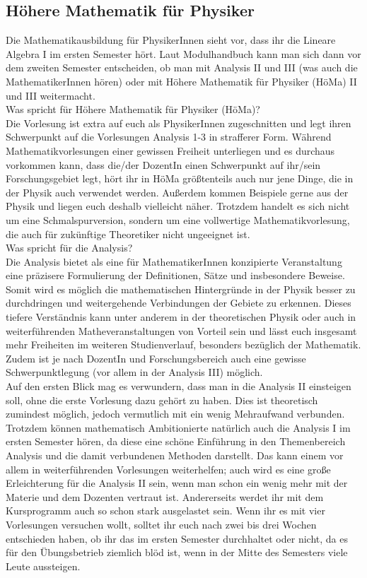 \subsection{Höhere Mathematik für Physiker}
\label{mathephysik}

Die Mathematikausbildung für PhysikerInnen sieht vor, dass ihr die Lineare Algebra I im ersten Semester hört. Laut Modulhandbuch kann man sich dann vor dem zweiten Semester entscheiden, ob man mit Analysis II und III (was auch die MathematikerInnen hören) oder mit Höhere Mathematik für Physiker (HöMa) II und III weitermacht.\\

Was spricht für Höhere Mathematik für Physiker (HöMa)?\\
Die Vorlesung ist extra auf euch als PhysikerInnen zugeschnitten und legt ihren Schwerpunkt auf die Vorlesungen Analysis 1-3 in strafferer Form. Während Mathematikvorlesungen einer gewissen Freiheit unterliegen und es durchaus vorkommen kann, dass die/der DozentIn einen Schwerpunkt auf ihr/sein Forschungsgebiet legt, hört ihr in HöMa größtenteils auch nur jene Dinge, die in der Physik auch verwendet werden. Außerdem kommen Beispiele gerne aus der Physik und liegen euch deshalb vielleicht näher. Trotzdem handelt es sich nicht um eine Schmalspurversion, sondern um eine vollwertige Mathematikvorlesung, die auch für zukünftige Theoretiker nicht ungeeignet ist.\\

Was spricht für die Analysis?\\
Die Analysis bietet als eine für MathematikerInnen konzipierte Veranstaltung eine präzisere Formulierung der Definitionen, Sätze und insbesondere Beweise. Somit wird es möglich die mathematischen Hintergründe in der Physik besser zu durchdringen und weitergehende Verbindungen der Gebiete zu erkennen. Dieses tiefere Verständnis kann unter anderem in der theoretischen Physik oder auch in weiterführenden Matheveranstaltungen von Vorteil sein und lässt euch insgesamt mehr Freiheiten im weiteren Studienverlauf, besonders bezüglich der Mathematik. Zudem ist je nach DozentIn und Forschungsbereich auch eine gewisse Schwerpunktlegung (vor allem in der Analysis III) möglich.\\

Auf den ersten Blick mag es verwundern, dass man in die Analysis II einsteigen soll, ohne die erste Vorlesung dazu gehört zu haben. Dies ist theoretisch zumindest möglich, jedoch vermutlich mit ein wenig Mehraufwand verbunden. Trotzdem können mathematisch Ambitionierte natürlich auch die Analysis I im ersten Semester hören, da diese eine schöne Einführung in den Themenbereich Analysis und die damit verbundenen Methoden darstellt. Das kann einem vor allem in weiterführenden Vorlesungen weiterhelfen; auch wird es eine große Erleichterung für die Analysis II sein, wenn man schon ein wenig mehr mit der Materie und dem Dozenten vertraut ist. Andererseits werdet ihr mit dem Kursprogramm auch so schon stark ausgelastet sein. Wenn ihr es mit vier Vorlesungen versuchen wollt, solltet ihr euch nach zwei bis drei Wochen entschieden haben, ob ihr das im ersten Semester durchhaltet oder nicht, da es für den Übungsbetrieb ziemlich blöd ist, wenn in der Mitte des Semesters viele Leute aussteigen.
